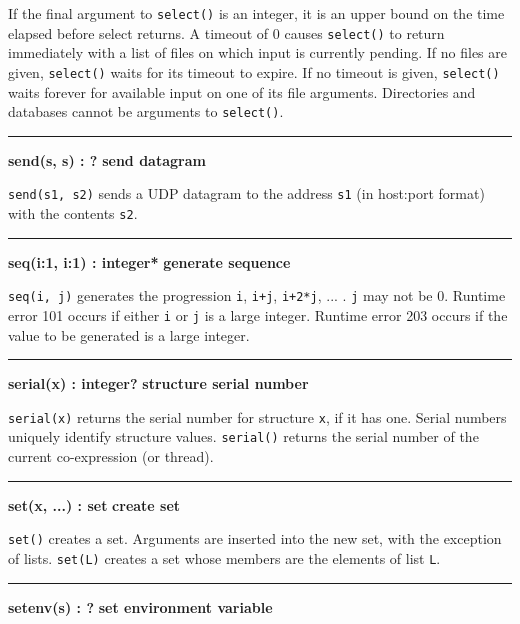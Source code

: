If the final argument to \texttt{select()} is an
integer, it is an upper bound on the time elapsed before select
returns. A timeout of 0 causes \texttt{select()} to return immediately
with a list of files on which input is currently pending. If no files
are given, \texttt{select()} waits for its timeout to expire. If no
timeout is given, \texttt{select()} waits forever for available input
on one of its file arguments. Directories and databases cannot be
arguments to \texttt{select()}.

\bigskip\hrule\vspace{0.1cm}
\noindent
{\bf send(s, s) : ? } \hfill {\bf send datagram}

\noindent
{}\texttt{send(s1, s2)} sends a UDP datagram to the
address \texttt{s1} (in host:port format) with the contents
\texttt{s2}.

\bigskip\hrule\vspace{0.1cm}
\noindent
{\bf seq(i:1, i:1) : integer* } \hfill {\bf generate sequence}

\noindent
{}\texttt{seq(i, j)} generates the
progression \texttt{i}, \texttt{i+j}, \texttt{i+2*j}, ... .
\texttt{j} may not be 0.  Runtime error 101 occurs if either
\texttt{i} or \texttt{j} is a large integer.  Runtime error 203
occurs if the value to be generated is a large integer.

\bigskip\hrule\vspace{0.1cm}
\noindent
{\bf serial(x) : integer? } \hfill {\bf structure serial number}

\noindent
{}\texttt{serial(x)} returns the serial number for
structure \texttt{x}, if it has one. Serial numbers uniquely identify
structure values. \texttt{serial()} returns the serial number of the
current co-expression (or thread).

\bigskip\hrule\vspace{0.1cm}
\noindent
{\bf set(x, ...) : set } \hfill {\bf create set}

\noindent
{}\texttt{set()} creates a set. Arguments
are inserted into the new set, with the exception of lists.
\texttt{set(L)} creates a set whose members are the elements of list
\texttt{L}.

\bigskip\hrule\vspace{0.1cm}
\noindent
{\bf setenv(s) : ? } \hfill {\bf set environment variable}

